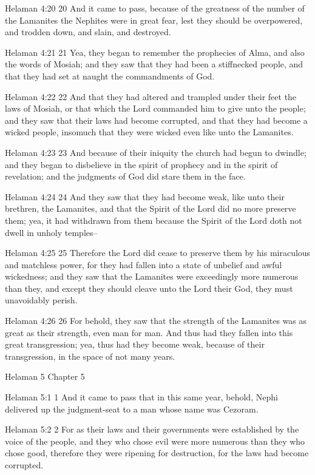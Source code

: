 Helaman 4:20
 20 And it came to pass, because of the greatness of the number
of the Lamanites the Nephites were in great fear, lest they
should be overpowered, and trodden down, and slain, and
destroyed.

Helaman 4:21
 21 Yea, they began to remember the prophecies of Alma, and also
the words of Mosiah; and they saw that they had been a
stiffnecked people, and that they had set at naught the
commandments of God.

Helaman 4:22
 22 And that they had altered and trampled under their feet the
laws of Mosiah, or that which the Lord commanded him to give unto
the people; and they saw that their laws had become corrupted,
and that they had become a wicked people, insomuch that they were
wicked even like unto the Lamanites.

Helaman 4:23
 23 And because of their iniquity the church had begun to
dwindle; and they began to disbelieve in the spirit of prophecy
and in the spirit of revelation; and the judgments of God did
stare them in the face.

Helaman 4:24
 24 And they saw that they had become weak, like unto their
brethren, the Lamanites, and that the Spirit of the Lord did no
more preserve them; yea, it had withdrawn from them because the
Spirit of the Lord doth not dwell in unholy temples--

Helaman 4:25
 25 Therefore the Lord did cease to preserve them by his
miraculous and matchless power, for they had fallen into a state
of unbelief and awful wickedness; and they saw that the Lamanites
were exceedingly more numerous than they, and except they should
cleave unto the Lord their God, they must unavoidably perish.

Helaman 4:26
 26 For behold, they saw that the strength of the Lamanites was
as great as their strength, even man for man. And thus had they
fallen into this great transgression; yea, thus had they become
weak, because of their transgression, in the space of not many
years.

Helaman 5
Chapter 5

Helaman 5:1
 1 And it came to pass that in this same year, behold, Nephi
delivered up the judgment-seat to a man whose name was Cezoram.

Helaman 5:2
 2 For as their laws and their governments were established by
the voice of the people, and they who chose evil were more
numerous than they who chose good, therefore they were ripening
for destruction, for the laws had become corrupted.

